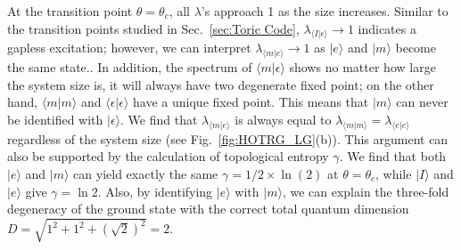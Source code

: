 \documentclass{ntuthesis}
\begin{document}
At the transition point $\theta = \theta_c$, all $\lambda$'s approach   1 as the size increases. 
%
Similar to the transition points studied in Sec.~\ref{sec:Toric Code}, $\lambda_{\langle I| \epsilon\rangle} \to 1$ indicates a gapless excitation; however, we can interpret $\lambda_{\langle m| e\rangle} \to 1$ as  $|e\rangle$ and $|m \rangle$ become the same state..
%
In addition, the spectrum of $\langle m|\epsilon \rangle$ shows no matter how large the system size is, it will  always have two degenerate fixed point; on the other hand, $\langle m|m \rangle$ and $\langle \epsilon|\epsilon \rangle$ have a unique fixed point.
This means that $|m\rangle$ can never be identified with $|\epsilon\rangle$.
We find that $\lambda_{\langle m| e\rangle}$ is always equal to $\lambda_{\langle m| m\rangle} = \lambda_{\langle e| e\rangle}$ regardless of the system size (see Fig.~\ref{fig:HOTRG_LG}(b)). 
This argument can also be supported by the calculation of topological entropy $\gamma$. 
%
We find that both $|e\rangle$ and $|m\rangle$ can yield exactly the same $\gamma = 1/2 \times \ln(2)$ at $\theta = \theta_c$, while $|I\rangle$ and $|e\rangle$ give $\gamma = \ln 2$. 
%
Also, by identifying  $|e\rangle$ with $|m\rangle$, we can explain the three-fold degeneracy of the ground state with the correct total quantum dimension $D = \sqrt{1^2+1^2+(\sqrt{2})^2} = 2$.
\end{document}
